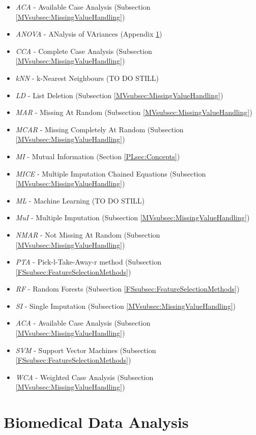 \documentclass[10pt,a4paper]{report}
\begin{document}
	\begin{itemize}
		\item \textit{ACA} - Available Case Analysis (Subsection \ref{MVsubsec:MissingValueHandling})
		\item \textit{ANOVA} - ANalysis of VAriances (Appendix \ref{app:BiomedicalDataAnalysis})
		\item \textit{CCA} - Complete Case Analysis (Subsection \ref{MVsubsec:MissingValueHandling})
		\item \textit{kNN} - k-Nearest Neighbours (TO DO STILL)
		\item \textit{LD} - List Deletion (Subsection \ref{MVsubsec:MissingValueHandling})
		\item \textit{MAR} - Missing At Random (Subsection \ref{MVsubsec:MissingValueHandling})
		\item \textit{MCAR} - Missing Completely At Random (Subsection \ref{MVsubsec:MissingValueHandling})
		\item \textit{MI} - Mutual Information (Section \ref{PLsec:Concepts})
		\item \textit{MICE} - Multiple Imputation Chained Equations (Subsection \ref{MVsubsec:MissingValueHandling})
		\item \textit{ML} - Machine Learning (TO DO STILL)
		\item \textit{MuI} - Multiple Imputation (Subsection \ref{MVsubsec:MissingValueHandling})
		\item \textit{NMAR} - Not Missing At Random (Subsection \ref{MVsubsec:MissingValueHandling})
		\item \textit{PTA} - Pick-l-Take-Away-r method (Subsection \ref{FSsubsec:FeatureSelectionMethods})
		\item \textit{RF} - Random Forests (Subsection \ref{FSsubsec:FeatureSelectionMethods})
		\item \textit{SI} - Single Imputation (Subsection \ref{MVsubsec:MissingValueHandling})
		\item \textit{ACA} - Available Case Analysis (Subsection \ref{MVsubsec:MissingValueHandling})
		\item \textit{SVM} - Support Vector Machines (Subsection \ref{FSsubsec:FeatureSelectionMethods})
		\item \textit{WCA} - Weighted Case Analysis (Subsection \ref{MVsubsec:MissingValueHandling})
	\end{itemize}
	
	
	\chapter{Biomedical Data Analysis}
	\label{app:BiomedicalDataAnalysis}
	
\end{document}
